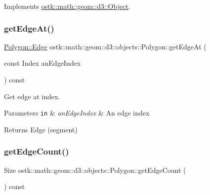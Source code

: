 Implements \hyperlink{classostk_1_1math_1_1geom_1_1d3_1_1_object_a676013f9555f6492687f9809b2db887b}{ostk\+::math\+::geom\+::d3\+::\+Object}.

\mbox{\label{classostk_1_1math_1_1geom_1_1d3_1_1objects_1_1_polygon_a7ea6e4173c73e34e344d04e3fda71f44}} 
\subsubsection{\texorpdfstring{get\+Edge\+At()}{getEdgeAt()}}
{\footnotesize\ttfamily \hyperlink{classostk_1_1math_1_1geom_1_1d3_1_1objects_1_1_polygon_a58c9a7e93e903b2226804116cce4f1ec}{Polygon\+::\+Edge} ostk\+::math\+::geom\+::d3\+::objects\+::\+Polygon\+::get\+Edge\+At (\begin{DoxyParamCaption}\item[{const Index}]{an\+Edge\+Index }\end{DoxyParamCaption}) const}



Get edge at index. 


\begin{DoxyParams}[1]{Parameters}
\mbox{\tt in}  & {\em an\+Edge\+Index} & An edge index \\
\hline
\end{DoxyParams}
\begin{DoxyReturn}{Returns}
Edge (segment) 
\end{DoxyReturn}
\mbox{\label{classostk_1_1math_1_1geom_1_1d3_1_1objects_1_1_polygon_a7872da49911dc99d02a748dc446a49d0}} 
\subsubsection{\texorpdfstring{get\+Edge\+Count()}{getEdgeCount()}}
{\footnotesize\ttfamily Size ostk\+::math\+::geom\+::d3\+::objects\+::\+Polygon\+::get\+Edge\+Count (\begin{DoxyParamCaption}{ }\end{DoxyParamCaption}) const}



